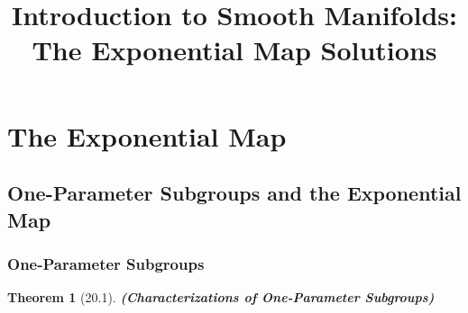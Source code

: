\documentclass[11pt]{amsart}
\title{Introduction to Smooth Manifolds: The Exponential Map Solutions}
\newtheorem{theorem}{Theorem}
\theoremstyle{definition}
\begin{document}
\maketitle
\section{The Exponential Map}
\subsection{One-Parameter Subgroups and the Exponential Map}

\subsubsection{One-Parameter Subgroups}

\begin{theorem}[20.1]\textbf{(Characterizations of One-Parameter Subgroups)}
\end{theorem}
\end{document}
